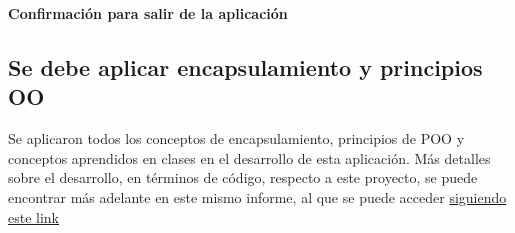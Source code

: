 \clearpage

\textbf{Confirmación para salir de la aplicación}

\begin{multicols}{2}

    \columnbreak

\end{multicols}

\subsection{Se debe aplicar encapsulamiento y principios OO}

Se aplicaron todos los conceptos de encapsulamiento, principios de POO y conceptos aprendidos en clases en el desarrollo de esta aplicación. Más detalles sobre el desarrollo, en términos de código, respecto a este proyecto, se puede encontrar más adelante en este mismo informe, al que se puede acceder {\color{MyGreen}\hyperref[subsec:desarrolloapp]{siguiendo este link}}

